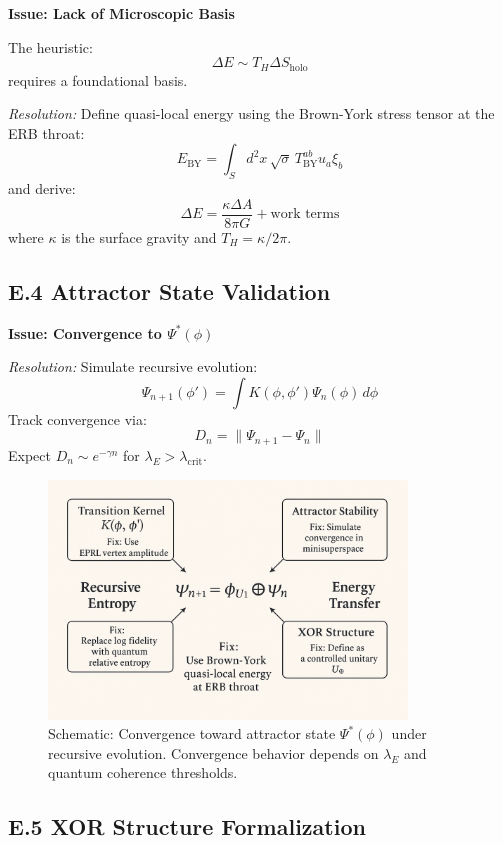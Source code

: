 \textbf{Issue: Lack of Microscopic Basis}

The heuristic:
\[
\Delta E \sim T_H \Delta S_{\text{holo}}
\]
requires a foundational basis.

\textit{Resolution:}  
Define quasi-local energy using the Brown-York stress tensor at the ERB throat:
\[
E_{\text{BY}} = \int_{S} d^2x \, \sqrt{\sigma} \, T^{ab}_{\text{BY}} u_a \xi_b
\]
and derive:
\[
\Delta E = \frac{\kappa \Delta A}{8\pi G} + \text{work terms}
\]
where $\kappa$ is the surface gravity and $T_H = \kappa / 2\pi$.

\subsection*{E.4 Attractor State Validation}

\textbf{Issue: Convergence to $\Psi^*(\phi)$}

\textit{Resolution:}  
Simulate recursive evolution:
\[
\Psi_{n+1}(\phi') = \int K(\phi, \phi') \Psi_n(\phi) \, d\phi
\]
Track convergence via:
\[
D_n = \|\Psi_{n+1} - \Psi_n\|
\]
Expect $D_n \sim e^{-\gamma n}$ for $\lambda_E > \lambda_{\text{crit}}$.

\begin{figure}[H]
\centering
\includegraphics[width=0.85\textwidth]{figures/appendix_e_resolutions.png}
\caption{Schematic: Convergence toward attractor state $\Psi^*(\phi)$ under recursive evolution. Convergence behavior depends on $\lambda_E$ and quantum coherence thresholds.}
\end{figure}

\subsection*{E.5 XOR Structure Formalization}

